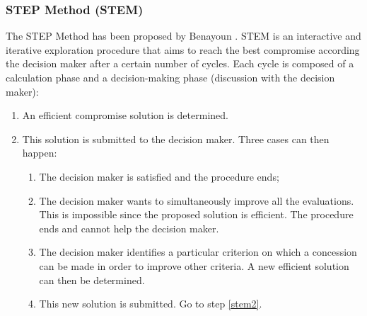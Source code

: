 
\subsubsection{STEP Method (STEM)}
The STEP Method has been proposed by Benayoun \cite{benayoun71}. STEM is an interactive and iterative exploration procedure that aims to reach the best compromise according the decision maker after a certain number of cycles. Each cycle is composed of a calculation phase and a decision-making phase (discussion with the decision maker):
\begin{enumerate}
\item An efficient compromise solution is determined.
\item This solution is submitted to the decision maker. Three cases can then happen:
	\begin{enumerate}
	\item \label{stem2} The decision maker is satisfied and the procedure ends;
	\item The decision maker wants to simultaneously improve all the evaluations. This is impossible since the proposed solution is efficient. The procedure ends and cannot help the decision maker.
	\item The decision maker identifies a particular criterion on which a concession can be made in order to improve other criteria. A new efficient solution can then be determined.
	\item This new solution is submitted. Go to step \ref{stem2}.
	\end{enumerate}
\end{enumerate}

